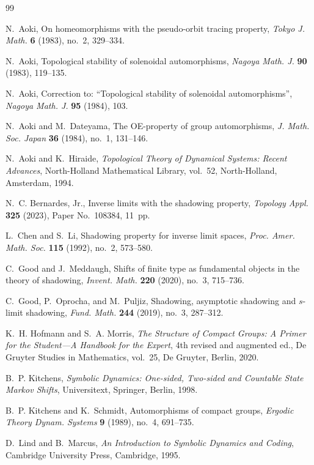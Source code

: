 \documentclass[12pt]{amsart}
\theoremstyle{definition}
\numberwithin{equation}{section}
\theoremstyle{remark}
\begin{document}
\begin{thebibliography}{99}

N.~Aoki,
On homeomorphisms with the pseudo-orbit tracing property,
\emph{Tokyo J. Math.} \textbf{6} (1983), no.~2, 329--334.

N.~Aoki,
Topological stability of solenoidal automorphisms,
\emph{Nagoya Math. J.} \textbf{90} (1983), 119--135.

N.~Aoki,
Correction to: ``Topological stability of solenoidal automorphisms'',
\emph{Nagoya Math. J.} \textbf{95} (1984), 103.

N.~Aoki and M.~Dateyama,
The OE-property of group automorphisms,
\emph{J. Math. Soc. Japan} \textbf{36} (1984), no.~1, 131--146.

N.~Aoki and K.~Hiraide,
\emph{Topological Theory of Dynamical Systems: Recent Advances},
North-Holland Mathematical Library, vol.~52,
North-Holland, Amsterdam, 1994.

N.~C. Bernardes, Jr.,
Inverse limits with the shadowing property,
\emph{Topology Appl.} \textbf{325} (2023), Paper No.~108384, 11~pp.

L.~Chen and S.~Li,
Shadowing property for inverse limit spaces,
\emph{Proc. Amer. Math. Soc.} \textbf{115} (1992), no.~2, 573--580.


C.~Good and J.~Meddaugh,
Shifts of finite type as fundamental objects in the theory of shadowing,
\emph{Invent. Math.} \textbf{220} (2020), no.~3, 715--736.

C.~Good, P.~Oprocha, and M.~Puljiz,
Shadowing, asymptotic shadowing and $s$-limit shadowing,
\emph{Fund. Math.} \textbf{244} (2019), no.~3, 287--312.

K.~H. Hofmann and S.~A. Morris,
\emph{The Structure of Compact Groups: A Primer for the Student---A Handbook for the Expert},
4th revised and augmented ed., De Gruyter Studies in Mathematics, vol.~25,
De Gruyter, Berlin, 2020.

B.~P. Kitchens,
\emph{Symbolic Dynamics: One-sided, Two-sided and Countable State Markov Shifts},
Universitext, Springer, Berlin, 1998.

B.~P. Kitchens and K.~Schmidt,
Automorphisms of compact groups,
\emph{Ergodic Theory Dynam. Systems} \textbf{9} (1989), no.~4, 691--735.

D.~Lind and B.~Marcus,
\emph{An Introduction to Symbolic Dynamics and Coding},
Cambridge University Press, Cambridge, 1995.



\end{thebibliography}
\end{document}
